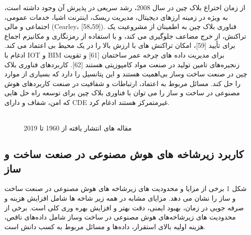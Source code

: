 \documentclass[towcolumn, 11pt]{Article}
\begin{document}
\begin{چکیده}
از زمان اختراع بلاک چین در سال 2008، رشد سریعی در پذیرش آن وجود داشته است، به ویژه در زمینه ارزهای دیجیتال، مدیریت ریسک، اینترنت اشیا، خدمات عمومی، اجتماعی و مالی (Cearley، [58،59]). فناوری بلاک چین به اطمینان از مشروعیت یک تراکنش، از خرج مضاعف جلوگیری می کند، و با استفاده از رمزنگاری و مکانیزم اجماع برای تأیید [59]، امکان تراکنش های با ارزش بالا را در یک محیط بی اعتماد می کند. ادغام با IOT و BIM برای مدیریت داده ‌های چرخه عمر ساختمان [61] و تقویت زنجیره‌های تامین تولید در صنعت مواد کامپوزیتی هستند [62]. کاربردهای فناوری بلاک چین در صنعت ساخت‌ وساز بی‌اهمیت هستند و این پتانسیل را دارد که بسیاری از موارد را حل کند. مسائل مربوط به اعتماد، ارتباطات و شفافیت در صنعت کاربردهای هوش مصنوعی در ساخت و ساز را می توان با فناوری بلاک چین برای توسعه راه حل هایی که امن، شفاف و دارای CDE غیرمتمرکز هستند ادغام کرد. 

\begin{figure}[t]
\includegraphics[width=1, height=1\linewidth]{Images/Frequency Of Paper.jpg}
\caption{مقاله های انتشار یافته از 1960 تا 2019}
\label{شکل:Frequency Of Paper}
\end{figure}


\subsection{کاربرد زیرشاخه های هوش مصنوعی در صنعت ساخت و ساز}
شکل 1 برخی از مزایا و محدودیت های زیرشاخه های هوش مصنوعی در صنعت ساخت و ساز را نشان می دهد. مزایای مشابه در همه زیر شاخه ها شامل افزایش هزینه و صرفه جویی در زمان، بهبود ایمنی، دقت بهتر و افزایش بهره وری کلی است. برخی از محدودیت ‌های زیرشاخه‌های هوش مصنوعی در ساخت ‌وساز شامل داده‌های ناقص، هزینه اولیه بالای استقرار، داده‌ها و مسائل مربوط به کسب دانش است.


\end{چکیده}
\end{document}
